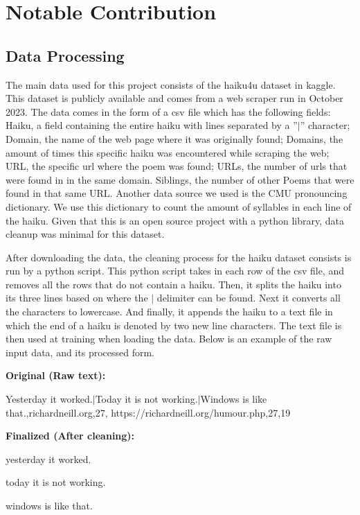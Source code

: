 \documentclass{article} %
\begin{document}
\section{Notable Contribution}

\subsection{Data Processing}
The main data used for this project consists of the haiku4u dataset in kaggle.
This dataset is publicly available and comes from a web scraper run in October 2023.
The data comes in the form of a csv file which has the following fields:
Haiku, a field containing the entire haiku with lines separated by a ”$|$” character;
Domain, the name of the web page where it was originally found;
Domains, the amount of times this specific haiku was encountered while scraping the web;
URL, the specific url where the poem was found;
URLs, the number of urls that were found in in the same domain.
Siblings, the number of other Poems that were found in that same URL.
Another data source we used is the CMU pronouncing dictionary.
We use this dictionary to count the amount of syllables in each line of the haiku.
Given that this is an open source project with a python library, data cleanup was minimal for this dataset.


After downloading the data, the cleaning process for the haiku dataset consists is run by a python script.
This python script takes in each row of the csv file, and removes all the rows that do not contain a haiku.
Then, it splits the haiku into its three lines based on where the $|$ delimiter can be found.
Next it converts all the characters to lowercase.
And finally, it appends the haiku to a text file in which the end of a haiku is denoted by two new line characters.
The text file is then used at training when loading the data.
Below is an example of the raw input data, and its processed form.



\begin{multicols}{2}

  \textbf{Original (Raw text):} \par
  Yesterday it worked.$|$Today it is not working.$|$Windows is
  like that.,richardneill.org,27,
  https://richardneill.org/humour.php,27,19

  \columnbreak

  \raggedleft
  \textbf{Finalized (After cleaning):} \par

  \raggedleft
  yesterday it worked.

  today it is not working.

  windows is like that.
\end{multicols}
\end{document}
